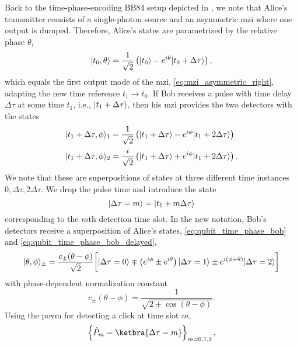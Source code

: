 Back to the time-phase-encoding BB84 setup depicted in , we note that Alice's transmitter consists of a single-photon source and an asymmetric \gls{mzi} where one output is dumped.
Therefore, Alice's states are parametrized by the relative phase $\theta$,
\begin{equation}
	\lvert t_0,\theta\rangle
	=
	\frac{1}{\sqrt{2}}
	\left(
		\lvert t_0\rangle
		-
		e^{i\theta}
		\lvert t_0+\Delta\tau\rangle
	\right)
	,
\end{equation}
which equals the first output mode of the \gls{mzi}, \cref{eq:mzi_asymmetric_right}, adapting the new time reference $t_1\to t_0$.
If Bob receives a pulse with time delay $\Delta\tau$ at some time $t_1$, i.e., $\lvert t_1+\Delta\tau\rangle$, then his \gls{mzi} provides the two detectors with the states
\begin{align}
	\lvert t_1+\Delta\tau,\phi\rangle_1
	&=
	\frac{1}{\sqrt{2}}
	\left(
		\lvert t_1+\Delta\tau\rangle
		-
		e^{i\phi}
		\lvert t_1+2\Delta\tau\rangle
	\right)
	\\
	\lvert t_1+\Delta\tau,\phi\rangle_2
	&=
	\frac{i}{\sqrt{2}}
	\left(
		\lvert t_1+\Delta\tau\rangle
		+
		e^{i\phi}
		\lvert t_1+2\Delta\tau\rangle
	\right)
	.
	\label{eq:qubit_time_phase_bob}
\end{align}
We note that these are superpositions of states at three different time instances $0,\Delta\tau,2\Delta\tau$.
We drop the pulse time and introduce the state
\begin{equation}
	\lvert\Delta\tau=m\rangle
	=
	\lvert t_1+m\Delta\tau\rangle
\end{equation}
corresponding to the $m$th detection time slot.
In the new notation, Bob's detectors receive a superposition of Alice's states, \cref{eq:qubit_time_phase_bob} and \cref{eq:qubit_time_phase_bob_delayed},
\begin{equation}
	\lvert\theta,\phi\rangle_\pm
	=
	\frac{c_\pm(\theta-\phi)}{\sqrt{2}}
	\biggl[
		\lvert\Delta\tau=0\rangle
		\mp
		\left(
			e^{i\phi}
			\pm
			e^{i\theta}
		\right)
		\lvert\Delta\tau=1\rangle
		\pm
		e^{i(\phi+\theta)}
		\lvert\Delta\tau=2\rangle
	\biggr]
	\label{eq:qubit_time_phase_bob_delayed}
\end{equation}
with phase-dependent normalization constant
\begin{equation}
	c_\pm(\theta-\phi)
	=
	\frac{1}{\sqrt{2\pm\cos(\theta-\phi)}}
	.
\end{equation}
Using the \gls{povm} for detecting a click at time slot $m$,
\begin{equation}
	\left\{
		\hat{P}_m
		=
		\ketbra{\Delta\tau=m}
	\right\}_{m=0,1,2}
	,
\end{equation}
